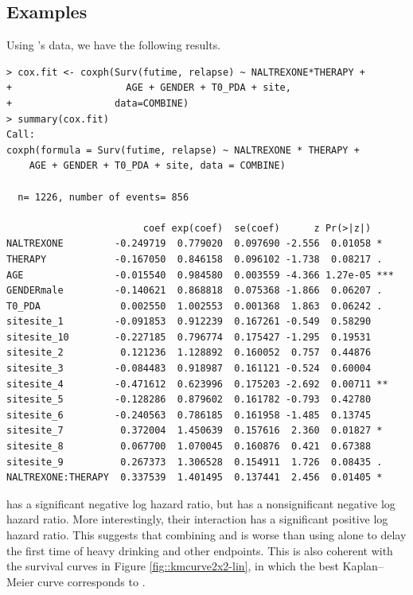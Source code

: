 \subsection{Examples}
Using \citet{lin2016simultaneous}'s data, we have the following results. 

\begin{lstlisting}
> cox.fit <- coxph(Surv(futime, relapse) ~ NALTREXONE*THERAPY + 
+                    AGE + GENDER + T0_PDA + site,
+                  data=COMBINE)
> summary(cox.fit)
Call:
coxph(formula = Surv(futime, relapse) ~ NALTREXONE * THERAPY + 
    AGE + GENDER + T0_PDA + site, data = COMBINE)

  n= 1226, number of events= 856 

                        coef exp(coef)  se(coef)      z Pr(>|z|)    
NALTREXONE         -0.249719  0.779020  0.097690 -2.556  0.01058 *  
THERAPY            -0.167050  0.846158  0.096102 -1.738  0.08217 .  
AGE                -0.015540  0.984580  0.003559 -4.366 1.27e-05 ***
GENDERmale         -0.140621  0.868818  0.075368 -1.866  0.06207 .  
T0_PDA              0.002550  1.002553  0.001368  1.863  0.06242 .  
sitesite_1         -0.091853  0.912239  0.167261 -0.549  0.58290    
sitesite_10        -0.227185  0.796774  0.175427 -1.295  0.19531    
sitesite_2          0.121236  1.128892  0.160052  0.757  0.44876    
sitesite_3         -0.084483  0.918987  0.161121 -0.524  0.60004    
sitesite_4         -0.471612  0.623996  0.175203 -2.692  0.00711 ** 
sitesite_5         -0.128286  0.879602  0.161782 -0.793  0.42780    
sitesite_6         -0.240563  0.786185  0.161958 -1.485  0.13745    
sitesite_7          0.372004  1.450639  0.157616  2.360  0.01827 *  
sitesite_8          0.067700  1.070045  0.160876  0.421  0.67388    
sitesite_9          0.267373  1.306528  0.154911  1.726  0.08435 .  
NALTREXONE:THERAPY  0.337539  1.401495  0.137441  2.456  0.01405 *  
\end{lstlisting}

 has a significant negative log hazard ratio, but  has a nonsignificant negative log hazard ratio. More interestingly, their interaction  has a significant positive log hazard ratio. This suggests that combining  and  is worse than using  alone to delay the first time of heavy drinking and other endpoints. This is also coherent with the survival curves in Figure \ref{fig::kmcurve2x2-lin}, in which the best Kaplan--Meier curve corresponds to .





